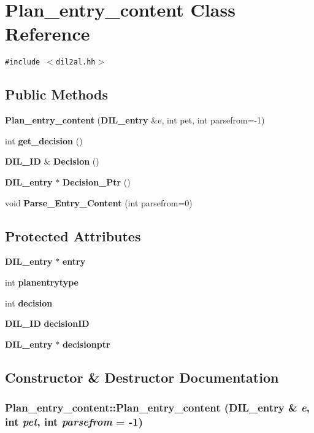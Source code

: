 \section{Plan\_\-entry\_\-content  Class Reference}
\label{classPlan__entry__content}
{\tt \#include $<$dil2al.hh$>$}

\subsection*{Public Methods}
\begin{CompactItemize}
\item 
{\bf Plan\_\-entry\_\-content} ({\bf DIL\_\-entry} \&e, int pet, int parsefrom=-1)
\item 
int {\bf get\_\-decision} ()
\item 
{\bf DIL\_\-ID} \& {\bf Decision} ()
\item 
{\bf DIL\_\-entry} $\ast$ {\bf Decision\_\-Ptr} ()
\item 
void {\bf Parse\_\-Entry\_\-Content} (int parsefrom=0)
\end{CompactItemize}
\subsection*{Protected Attributes}
\begin{CompactItemize}
\item 
{\bf DIL\_\-entry} $\ast$ {\bf entry}
\item 
int {\bf planentrytype}
\item 
int {\bf decision}
\item 
{\bf DIL\_\-ID} {\bf decision\-ID}
\item 
{\bf DIL\_\-entry} $\ast$ {\bf decisionptr}
\end{CompactItemize}


\subsection{Constructor \& Destructor Documentation}
\subsubsection{\setlength{\rightskip}{0pt plus 5cm}Plan\_\-entry\_\-content::Plan\_\-entry\_\-content ({\bf DIL\_\-entry} \& {\em e}, int {\em pet}, int {\em parsefrom} = -1)\hspace{0.3cm}{\tt  [inline]}}\label{classPlan__entry__content_a0}




